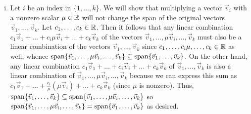 \documentclass[main.tex]{subfiles}
\begin{document}
\begin{soln}
\begin{enumerate}[(i)]
        \item Let $i$ be an index in $\{1, \ldots , k\}$. We will show that multiplying a vector $\vec{v}_{i}$ with a nonzero scalar $\mu\in \mathbb R$ will not change the span of the original vectors $\vec{v}_{1}, \ldots , \vec{v}_{k}$. Let $c_1, \ldots , c_k\in \mathbb R$. Then it follows that any linear combination $c_1\vec{v}_{1} + \ldots + c_i\mu\vec{v}_{i} + \ldots + c_k\vec{v}_{k}$ of the vectors $\vec{v}_{1}, \ldots , \mu\vec{v}_{i}, \ldots , \vec{v}_{k}$ must also be a linear combination of the vectors $\vec{v}_{1}, \ldots, \vec{v}_{k}$ since $c_1, \ldots , c_i\mu , \ldots , c_k\in \mathbb R$ as well, whence $\operatorname{span}\{\vec{v}_{1}, \ldots , \mu\vec{v}_{i}, \ldots , \vec{v}_{k}\}\subseteq \operatorname{span}\{\vec{v}_{1}, \ldots , \vec{v}_{k}\}$. On the other hand, any linear combination $c_1\vec{v}_{1} + \ldots + c_i\vec{v}_{i} + \ldots + c_k\vec{v}_{k}$ of $\vec{v}_{1}, \ldots, \vec{v}_{k}$ is also a linear combination of $\vec{v}_{1}, \ldots , \mu\vec{v}_{i}, \ldots , \vec{v}_{k}$ because we can express this sum as $c_1\vec{v}_{1} + \ldots + \frac{c_i}{\mu}(\mu\vec{v}_{i}) + \ldots + c_k\vec{v}_{k}$ (since $\mu$ is nonzero). Thus, $\operatorname{span}\{\vec{v}_{1}, \ldots , \vec{v}_{k}\}\subseteq \operatorname{span}\{\vec{v}_{1}, \ldots , \mu\vec{v}_{i}, \ldots , \vec{v}_{k}\}$ so $\operatorname{span}\{\vec{v}_{1}, \ldots , \mu\vec{v}_{i}, \ldots , \vec{v}_{k}\} = \operatorname{span}\{\vec{v}_{1}, \ldots , \vec{v}_{k}\}$ as desired.
        

\end{enumerate}
\end{soln}
\end{document}
